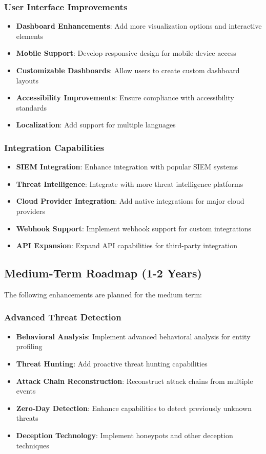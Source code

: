 \subsubsection{User Interface Improvements}
\begin{itemize}
    \item \textbf{Dashboard Enhancements}: Add more visualization options and interactive elements
    \item \textbf{Mobile Support}: Develop responsive design for mobile device access
    \item \textbf{Customizable Dashboards}: Allow users to create custom dashboard layouts
    \item \textbf{Accessibility Improvements}: Ensure compliance with accessibility standards
    \item \textbf{Localization}: Add support for multiple languages
\end{itemize}

\subsubsection{Integration Capabilities}
\begin{itemize}
    \item \textbf{SIEM Integration}: Enhance integration with popular SIEM systems
    \item \textbf{Threat Intelligence}: Integrate with more threat intelligence platforms
    \item \textbf{Cloud Provider Integration}: Add native integrations for major cloud providers
    \item \textbf{Webhook Support}: Implement webhook support for custom integrations
    \item \textbf{API Expansion}: Expand API capabilities for third-party integration
\end{itemize}

\subsection{Medium-Term Roadmap (1-2 Years)}
The following enhancements are planned for the medium term:

\subsubsection{Advanced Threat Detection}
\begin{itemize}
    \item \textbf{Behavioral Analysis}: Implement advanced behavioral analysis for entity profiling
    \item \textbf{Threat Hunting}: Add proactive threat hunting capabilities
    \item \textbf{Attack Chain Reconstruction}: Reconstruct attack chains from multiple events
    \item \textbf{Zero-Day Detection}: Enhance capabilities to detect previously unknown threats
    \item \textbf{Deception Technology}: Implement honeypots and other deception techniques
\end{itemize}

